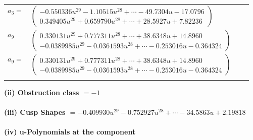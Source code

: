\documentclass[1p]{elsarticle_modified}
\theoremstyle{definition}
\begin{document}
\begin{tabular}{m{7pt} m{180pt} m{7pt} m{180pt} }
\flushright $a_{3}=$&$\begin{pmatrix}-0.550336 u^{29}-1.10515 u^{28}+\cdots-49.7304 u-17.0796\\0.349405 u^{29}+0.659790 u^{28}+\cdots+28.5927 u+7.82236\end{pmatrix}$ \\
\flushright $a_{9}=$&$\begin{pmatrix}0.330131 u^{29}+0.777311 u^{28}+\cdots+38.6348 u+14.8960\\-0.0389985 u^{29}-0.0361593 u^{28}+\cdots-0.253016 u-0.364324\end{pmatrix}$\\ \flushright $a_{9}=$&$\begin{pmatrix}0.330131 u^{29}+0.777311 u^{28}+\cdots+38.6348 u+14.8960\\-0.0389985 u^{29}-0.0361593 u^{28}+\cdots-0.253016 u-0.364324\end{pmatrix}$\\&\end{tabular}
\flushleft \textbf{(ii) Obstruction class $= -1$}\\~\\
\flushleft \textbf{(iii) Cusp Shapes $= -0.409930 u^{29}-0.752927 u^{28}+\cdots-34.5863 u+2.19818$}\\~\\
\newpage\renewcommand{\arraystretch}{1}
\flushleft \textbf{(iv) u-Polynomials at the component}\newline \\
\end{document}
